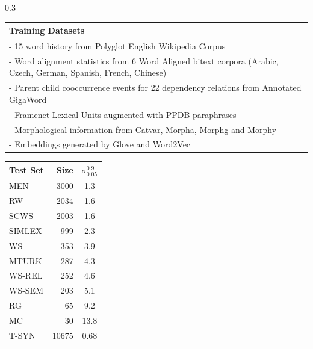 \begin{frame}[t]
\begin{columns}[t]
\begin{column}{\twocolwid}
  \begin{column}{\twocolwid}
    \begin{columns}[t,totalwidth=\twocolwid]
      \begin{column}{0.3\twocolwid}\vspace{-1.5in}
        {\begin{table}[htbp]
            \centering
            \begin{tabular}{p{\linewidth}}
              Training Datasets \\\hline
              - 15 word history from Polyglot English Wikipedia Corpus \\
              - Word alignment statistics from 6 Word Aligned bitext corpora (Arabic, Czech, German, Spanish, French, Chinese) \\
              - Parent child cooccurrence events for 22 dependency relations from Annotated GigaWord \\ 
              - Framenet Lexical Units augmented with PPDB paraphrases \\
              - Morphological information from Catvar, Morpha, Morphg and Morphy\\
              - Embeddings generated by Glove and Word2Vec\vspace{10pt}\hline
            \end{tabular}
          \end{table}
        }
        {\begin{table}[htbp]
           \centering
          \begin{tabular*}{450pt}{@{\extracolsep{\fill}}l r c}
            Test Set & Size  & $\sigma_{0.05}^{0.9}$\\\hline
            MEN    & 3000  & 1.3 \\
            RW     & 2034  & 1.6 \\
            SCWS   & 2003  & 1.6 \\
            SIMLEX & 999   & 2.3 \\
            WS     & 353   & 3.9 \\
            MTURK  & 287   & 4.3 \\
            WS-REL & 252   & 4.6 \\
            WS-SEM & 203   & 5.1 \\
            RG     & 65    & 9.2 \\
            MC     & 30    & 13.8\\\hline
            T-SYN  & 10675 & 0.68\\

\end{tabular*}
\end{table}}
\end{column}
\end{columns}
\end{column}
\end{column}
\end{columns}
\end{frame}
